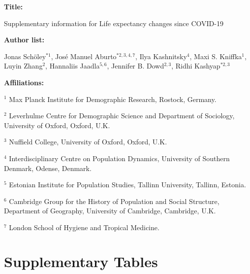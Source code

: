 \documentclass[12pt]{article}
\begin{document}
\begin{titlepage}


{\textbf{Title:}\par
Supplementary information for Life expectancy changes since COVID-19
\par\medskip}

{\textbf{Author list:}\par
Jonas Schöley$^{*1}$,
José Manuel Aburto$^{*2,3,4,7}$,
Ilya Kashnitsky$^{4}$,
Maxi S. Kniffka$^1$,
Luyin Zhang$^2$,
Hannaliis Jaadla$^{5,6}$,
Jennifer B. Dowd$^{2,3}$,
Ridhi Kashyap$^{*2,3}$
\par\medskip}

{\textbf{Affiliations:}\par
$^1$ Max Planck Institute for Demographic Research, Rostock, Germany.\par
$^2$ Leverhulme Centre for Demographic Science and Department of Sociology, University of Oxford, Oxford, U.K.\par
$^3$ Nuffield College, University of Oxford, Oxford, U.K.\par
$^4$ Interdisciplinary Centre on Population Dynamics, University of Southern Denmark, Odense, Denmark.\par
$^5$ Estonian Institute for Population Studies, Tallinn University, Tallinn, Estonia.\par
$^6$ Cambridge Group for the History of Population and Social Structure, Department of Geography, University of Cambridge, Cambridge, U.K.\par
$^7$ London School of Hygiene and Tropical Medicine.\par
\par\medskip}

\end{titlepage}

\renewcommand{\figurename}{Supplementary Figure}
\renewcommand\thefigure{\arabic{figure}}
\setcounter{figure}{0}
\renewcommand{\tablename}{Supplementary Table}
\renewcommand\thetable{\arabic{table}}
\setcounter{table}{0}


\section*{Supplementary Tables}
\end{document}
